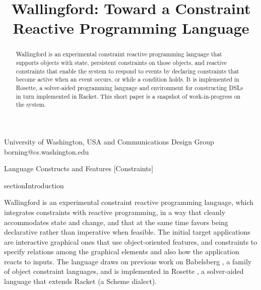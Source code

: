 \documentclass{sigplanconf}
\begin{document}

\sloppy


\setlength{\pdfpageheight}{\paperheight}
\setlength{\pdfpagewidth}{\paperwidth}


\title{Wallingford: Toward a Constraint \\  Reactive Programming Language}

{University of Washington, USA and Communications Design Group}
{borning@cs.washington.edu}

\maketitle

\begin{abstract}
Wallingford is an experimental constraint reactive programming language
that supports objects with state, persistent constraints on those objects,
and reactive constraints that enable the system to respond to events by
declaring constraints that become active when an event occurs, or while a
condition holds.  It is implemented in Rosette, a solver-aided programming
language and environment for constructing DSLs in turn implemented in
Racket.  This short paper is a snapshot of work-in-progress on the system.

\end{abstract}

         {Language Constructs and Features}
         [Constraints]


section{Introduction}

Wallingford is an experimental constraint reactive programming
language, which integrates constraints with reactive programming, in a
way that cleanly accommodates state and change, and that at the same
time favors being declarative rather than imperative when feasible.
The initial target applications are interactive graphical ones that
use object-oriented features, and constraints to specify relations
among the graphical elements and also how the application reacts to
inputs.  The language draws on previous work on Babelsberg
\cite{FelgentreffJOT14,felgentreff-oopsla-2015}, a family of
object constraint languages, and is implemented in Rosette
\cite{torlak-onward-2013,torlak-pldi-2014}, a
solver-aided language that extends Racket (a Scheme dialect).
\end{document}
